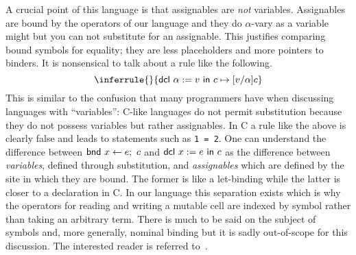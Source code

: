 A crucial point of this language is that assignables are \emph{not}
variables. Assignables are bound by the operators of our language and
they do $\alpha$-vary as a variable might but you can not substitute
for an assignable. This justifies comparing bound symbols for
equality; they are less placeholders and more pointers to binders. It
is nonsensical to talk about a rule like the following.
\[
  \inferrule{ }{\step{\dcl{\alpha}{v}{c}}{[v/\alpha]c}}
\]
This is similar to the confusion that many programmers have when
discussing languages with ``variables'': C-like languages do not
permit substitution because they do not possess variables but rather
assignables. In C a rule like the above is clearly false and leads to
statements such as \verb+1 = 2+. One can understand the difference
between $\mathsf{bnd}\ x \gets e;\ c$ and $\mathsf{dcl}\ x := e\ \mathsf{in}\ c$ as the difference between
\emph{variables}, defined through substitution, and \emph{assignables}
which are defined by the site in which they are bound. The former is
like a let-binding while the latter is closer to a declaration in
C. In our language this separation exists which is why the operators
for reading and writing a mutable cell are indexed by symbol rather
than taking an arbitrary term. There is much to be said on the subject
of symbols and, more generally, nominal binding but it is sadly
out-of-scope for this discussion. The interested reader is referred
to~\citep{Pitts:13}.

